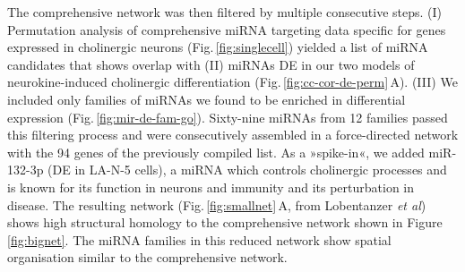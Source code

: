 The comprehensive network was then filtered by multiple consecutive steps. (I) Permutation analysis of comprehensive miRNA targeting data specific for genes expressed in cholinergic neurons (Fig.\,\ref{fig:singlecell}) yielded a list of miRNA candidates that shows overlap with (II) miRNAs DE in our two models of neurokine-induced cholinergic differentiation (Fig.\,\ref{fig:cc-cor-de-perm}\,A). (III) We included only families of miRNAs we found to be enriched in differential expression (Fig.\,\ref{fig:mir-de-fam-go}). Sixty-nine miRNAs from 12 families passed this filtering process and were consecutively assembled in a force-directed network with the 94 genes of the previously compiled list. As a »spike-in«, we added miR-132-3p (DE in LA-N-5 cells), a miRNA which controls cholinergic processes\cite{Shaltiel2013, Hanin2018} and is known for its function in neurons\cite{Mellios2011} and immunity\cite{Shaked2009} and its perturbation in disease\cite{Pichler2017}. The resulting network (Fig.\,\ref{fig:smallnet}\,A, from Lobentanzer \emph{et al}\cite{Lobentanzer2019a}) shows high structural homology to the comprehensive network shown in Figure \ref{fig:bignet}. The miRNA families in this reduced network show spatial organisation similar to the comprehensive network. 

